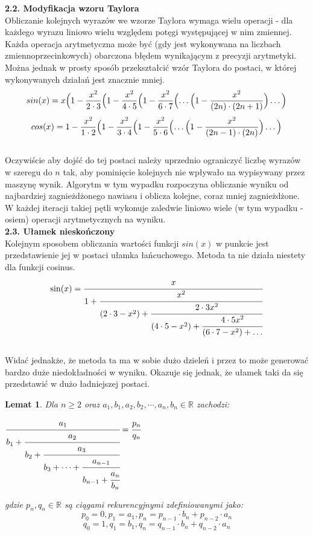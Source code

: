 \documentclass[a4paper]{article}
\newtheorem{theorem}{Lemat}
\begin{document}
\large
\textbf{2.2. Modyfikacja wzoru Taylora}\\
\normalsize
Obliczanie kolejnych wyrazów we wzorze Taylora wymaga wielu operacji - dla każdego wyrazu liniowo wielu względem potęgi występującej w nim zmiennej. Każda operacja arytmetyczna może być (gdy jest wykonywana na liczbach zmiennoprzecinkowych) obarczona błędem wynikającym z precyzji arytmetyki. Można jednak w prosty sposób przekształcić wzór Taylora do postaci, w której wykonywanych działań jest znacznie mniej.
\begin{equation}\label{sinTaylor2}
sin(x) = x \Bigl(1 - \frac{x^2}{2 \cdot 3} \Bigl(1 - \frac{x^2}{4 \cdot 5}\Bigl( 1 - \frac{x^2}{6 \cdot 7} \Bigl( \dots \Bigl(1 - \frac{x^2}{(2n) \cdot (2n+1)} \Bigr)\dots \Bigr)
\end{equation}
\begin{equation}\label{cosTaylor2}
cos(x) = 1 - \frac{x^2}{1 \cdot 2} \Bigl(1 - \frac{x^2}{3 \cdot 4}\Bigl(1 - \frac{x^2}{5 \cdot 6}\Bigl( \dots \Bigl(1 - \frac{x^2}{(2n-1) \cdot (2n)}\Bigr) \dots \Bigr)
\end{equation}\\
Oczywiście aby dojść do tej postaci należy uprzednio ograniczyć liczbę wyrazów w szeregu do $n$ tak, aby pominięcie kolejnych nie wpływało na wypisywany przez maszynę wynik. Algorytm w tym wypadku rozpoczyna obliczanie wyniku od najbardziej zagnieżdżonego nawiasu i oblicza kolejne, coraz mniej zagnieżdżone. W każdej iteracji takiej pętli wykonuje zaledwie liniowo wiele (w tym wypadku - osiem) operacji arytmetycznych na wyniku. \\
\newpage
\large
\textbf{2.3. Ułamek nieskończony}\\
\normalsize
Kolejnym sposobem obliczania wartości funkcji $sin(x)$ w punkcie jest przedstawienie jej w postaci ułamka łańcuchowego.\cite{CO} Metoda ta nie działa niestety dla funkcji cosinus.\\
\begin{equation}
\sin (x)={\cfrac  {x}{1+{\cfrac  {x^{2}}{(2\cdot 3-x^{2})+{\cfrac  {2\cdot 3x^{2}}{(4\cdot 5-x^{2})+{\cfrac  {4\cdot 5x^{2}}{(6\cdot 7-x^{2})+\dots }}}}}}}}
\end{equation}\\
Widać jednakże, że metoda ta ma w sobie dużo dzieleń i przez to może generować bardzo duże niedokładności w wyniku. Okazuje się jednak, że ułamek taki da się przedstawić w dużo ładniejszej postaci.
\begin{theorem}
Dla $n \geq 2$ oraz $a_1 , b_1 , a_2 , b_2 , \cdots , a_n , b_n \in \mathbb{R}$ zachodzi:
\begin{center}
$\cfrac {a_1}{b_1 + {\cfrac {a_2}{b_2+{\cfrac {a_3}{b_3 + \cdots +\cfrac  {a_{n-1}}{b_{n-1} + \cfrac {a_n}{b_n}}}}}}} = \cfrac{p_n}{q_n}$
\end{center}
gdzie ${p_n} , {q_n} \in \mathbb{R}$ są ciągami rekurencyjnymi zdefiniowanymi jako:
\begin{equation}
p_0 = 0  ,  p_1 = a_1  ,  p_n = p_{n-1} \cdot b_n + p_{n-2} \cdot a_n
\end{equation}
\begin{equation}
q_0 = 1  ,  q_1 = b_1  ,  q_n = q_{n-1} \cdot b_n + q_{n-2} \cdot a_n
\end{equation}
\end{theorem}
\end{document}
